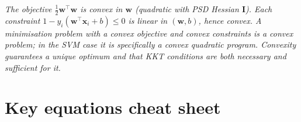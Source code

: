 \documentclass[11pt, a4paper]{article}
\begin{document}
\begin{exambox}
\textit{The objective $\tfrac{1}{2}\mathbf{w}^\top\mathbf{w}$ is convex in $\mathbf{w}$ (quadratic with PSD Hessian $\mathbf{I}$). Each constraint $1 - y_i(\mathbf{w}^\top\mathbf{x}_i + b) \le 0$ is linear in $(\mathbf{w}, b)$, hence convex. A minimisation problem with a convex objective and convex constraints is a convex problem; in the SVM case it is specifically a convex quadratic program. Convexity guarantees a unique optimum and that KKT conditions are both necessary and sufficient for it.}
\end{exambox}

\section*{Key equations cheat sheet}
\end{document}
